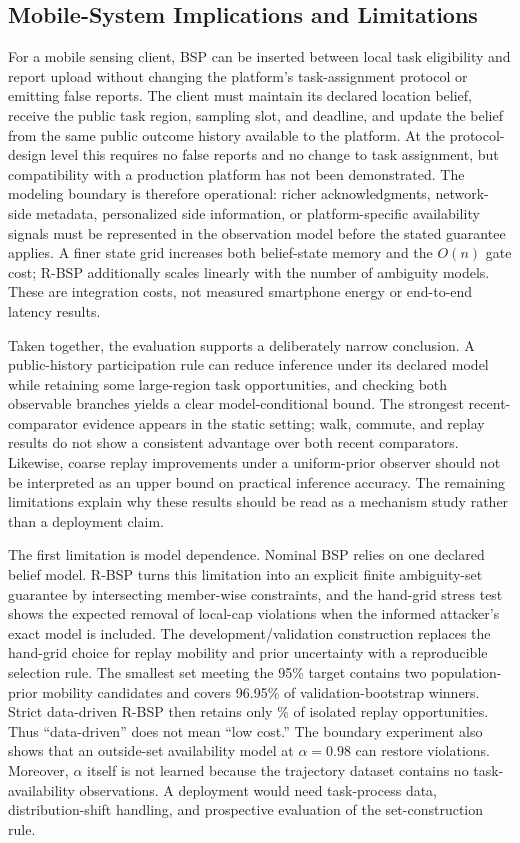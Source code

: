 \documentclass[10pt,journal,compsoc]{IEEEtran}
\begin{document}
\subsection{Mobile-System Implications and Limitations}
For a mobile sensing client, BSP can be inserted between local task eligibility and report upload without changing the platform's task-assignment protocol or emitting false reports. The client must maintain its declared location belief, receive the public task region, sampling slot, and deadline, and update the belief from the same public outcome history available to the platform. At the protocol-design level this requires no false reports and no change to task assignment, but compatibility with a production platform has not been demonstrated. The modeling boundary is therefore operational: richer acknowledgments, network-side metadata, personalized side information, or platform-specific availability signals must be represented in the observation model before the stated guarantee applies. A finer state grid increases both belief-state memory and the $O(n)$ gate cost; R-BSP additionally scales linearly with the number of ambiguity models. These are integration costs, not measured smartphone energy or end-to-end latency results.

Taken together, the evaluation supports a deliberately narrow conclusion. A public-history participation rule can reduce inference under its declared model while retaining some large-region task opportunities, and checking both observable branches yields a clear model-conditional bound. The strongest recent-comparator evidence appears in the static setting; walk, commute, and replay results do not show a consistent advantage over both recent comparators. Likewise, coarse replay improvements under a uniform-prior observer should not be interpreted as an upper bound on practical inference accuracy. The remaining limitations explain why these results should be read as a mechanism study rather than a deployment claim.

The first limitation is model dependence. Nominal BSP relies on one declared belief model. R-BSP turns this limitation into an explicit finite ambiguity-set guarantee by intersecting member-wise constraints, and the hand-grid stress test shows the expected removal of local-cap violations when the informed attacker's exact model is included. The development/validation construction replaces the hand-grid choice for replay mobility and prior uncertainty with a reproducible selection rule. The smallest set meeting the 95\% target contains two population-prior mobility candidates and covers 96.95\% of validation-bootstrap winners. Strict data-driven R-BSP then retains only \GeoStrictRet\% of isolated replay opportunities. Thus ``data-driven'' does not mean ``low cost.'' The boundary experiment also shows that an outside-set availability model at $\alpha=0.98$ can restore violations. Moreover, $\alpha$ itself is not learned because the trajectory dataset contains no task-availability observations. A deployment would need task-process data, distribution-shift handling, and prospective evaluation of the set-construction rule.
\end{document}
